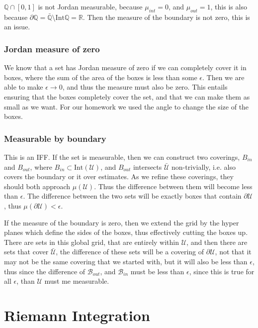 \documentclass[12pt]{amsart}
\newcommand{\U}{\mathcal{U}}
\newcommand{\B}{\mathcal{B}}
\newcommand{\ra}{\rightarrow}
\newcommand{\R}{\mathbb{R}}
\newcommand{\Q}{\mathbb{Q}}
\begin{document}
$\Q\cap[0,1]$ is not Jordan measurable, because $\mu_{int}=0$, and
$\mu_{out}=1$, this is also because $\partial
\Q=\bar{\Q}\setminus\text{Int}{\Q}=\R$. Then the measure of the boundary is not
zero, this is an issue.

\subsubsection{Jordan measure of zero}%
\label{ssub:jordan_measure_of_zero}

We know that a set has Jordan measure of zero if we can completely cover it in
boxes, where the sum of the area of the boxes is less than some $\epsilon$.
Then we are able to make $\epsilon\ra0$, and thus the measure must also be
zero. This entails ensuring that the boxes completely cover the set, and that
we can make them as small as we want. For our homework we used the angle to
change the size of the boxes.

\subsubsection{Measurable by boundary}%
\label{ssub:measurable_by_boundary}

This is an IFF. If the set is measurable, then we can construct two coverings,
$B_{in}$ and $B_{out}$, where $B_{in}\subset\text{Int}(\U)$, and $B_{out}$
intersects $\bar{\U}$ non-trivially, i.e. also covers the boundary or it over
estimates. As we refine these coverings, they should both approach $\mu(\U)$.
Thus the difference between them will become less than $\epsilon$. The
difference between the two sets will be exactly boxes that contain $\partial
\U$, thus $\mu(\partial\U)<\epsilon$.

If the measure of the boundary is zero, then we extend the grid by the
hyper planes which define the sides of the boxes, thus effectively cutting the
boxes up. There are sets in this global grid, that are entirely within $\U$,
and then there are sets that cover $\bar{\U}$, the difference of these sets
will be a covering of $\partial \U$, not that it may not be the same covering
that we started with, but it will also be less than $\epsilon$, thus since the
difference of $\B_{out}$, and $\B_{in}$ must be less than $\epsilon$, since
this is true for all $\epsilon$, than $\U$ must me measurable.

\section{Riemann Integration}%
\label{sec:riemann_integration}
\end{document}
